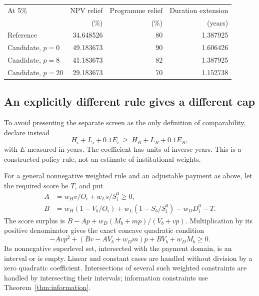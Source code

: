 \documentclass[11pt,a4paper]{article}
\begin{document}
\begin{center}\small
\begin{tabular}{lrrr}\toprule
At 5\% & NPV relief & Programme relief & Duration extension\\
 & (\%) & (\%) & (years)\\\midrule
Reference &34.648526&80&1.387925\\
Candidate, $p=0$ &49.183673&90&1.606426\\
Candidate, $p=8$ &41.183673&82&1.387925\\
Candidate, $p=20$ &29.183673&70&1.152738\\\bottomrule
\end{tabular}
\end{center}

\subsection{An explicitly different rule gives a different cap}\label{sec:weightedcap}
To avoid presenting the separate screen as the only definition of comparability, declare instead
\begin{equation}\label{eq:chosenweight}
 H_i+L_i+0.1E_i\ \geq\ H_R+L_R+0.1E_R,
\end{equation}
with $E$ measured in years. The coefficient has units of inverse years. This is a constructed policy rule, not an estimate of institutional weights.

For a general nonnegative weighted rule and an adjustable payment as above, let the required score be $T$, and put
\begin{align}
 A&=w_Hv/O_i+w_Ls/S_i^0\geq0,\\
 B&=w_H(1-V_b/O_i)+w_L(1-S_b/S_i^0)-w_DD_i^0-T.
\end{align}
The score surplus is $B-Ap+w_D(M_b+mp)/(V_b+vp)$. Multiplication by its positive denominator gives the exact concave quadratic condition
\begin{equation}\label{eq:weightedpoly}
 -Avp^2+(Bv-AV_b+w_Dm)p+BV_b+w_DM_b\geq0.
\end{equation}
Its nonnegative superlevel set, intersected with the payment domain, is an interval or is empty. Linear and constant cases are handled without division by a zero quadratic coefficient. Intersections of several such weighted constraints are handled by intersecting their intervals; information constraints use Theorem~\ref{thm:information}.
\end{document}
